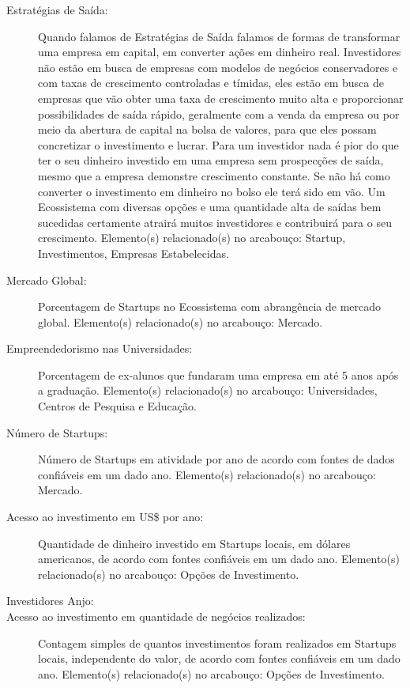 \begin{description}

  \item [Estratégias de Saída:] Quando falamos de Estratégias de Saída falamos de formas de transformar uma empresa em capital, em converter ações em dinheiro real. Investidores não estão em busca de empresas com modelos de negócios conservadores e com taxas de crescimento controladas e tímidas, eles estão em busca de empresas que vão obter uma taxa de crescimento muito alta e proporcionar possibilidades de saída rápido, geralmente com a venda da empresa ou por meio da abertura de capital na bolsa de valores, para que eles possam concretizar o investimento e lucrar. Para um investidor nada é pior do que ter o seu dinheiro investido em uma empresa sem prospecções de saída, mesmo que a empresa demonstre crescimento constante. Se não há como converter o investimento em dinheiro no bolso ele terá sido em vão. Um Ecossistema com diversas opções e uma quantidade alta de saídas bem sucedidas certamente atrairá muitos investidores e contribuirá para o seu crescimento. Elemento(s) relacionado(s) no arcabouço: Startup, Investimentos, Empresas Estabelecidas.

  \item [Mercado Global:] Porcentagem de Startups no Ecossistema com abrangência de mercado global. Elemento(s) relacionado(s) no arcabouço: Mercado.

  \item [Empreendedorismo nas Universidades:] Porcentagem de ex-alunos que fundaram uma empresa em até 5 anos após a graduação. Elemento(s) relacionado(s) no arcabouço: Universidades, Centros de Pesquisa e Educação.

  \item [Número de Startups:] Número de Startups em atividade por ano de acordo com fontes de dados confiáveis em um dado ano. Elemento(s) relacionado(s) no arcabouço: Mercado.

  \item [Acesso ao investimento em US\$ por ano:] Quantidade de dinheiro investido em Startups locais, em dólares americanos, de acordo com fontes confiáveis em um dado ano. Elemento(s) relacionado(s) no arcabouço: Opções de Investimento. 

  \item [Investidores Anjo: ]

  \item [Acesso ao investimento em quantidade de negócios realizados:] Contagem simples de quantos investimentos foram realizados em Startups locais, independente do valor, de acordo com fontes confiáveis em um dado ano. Elemento(s) relacionado(s) no arcabouço: Opções de Investimento.


\end{description}
